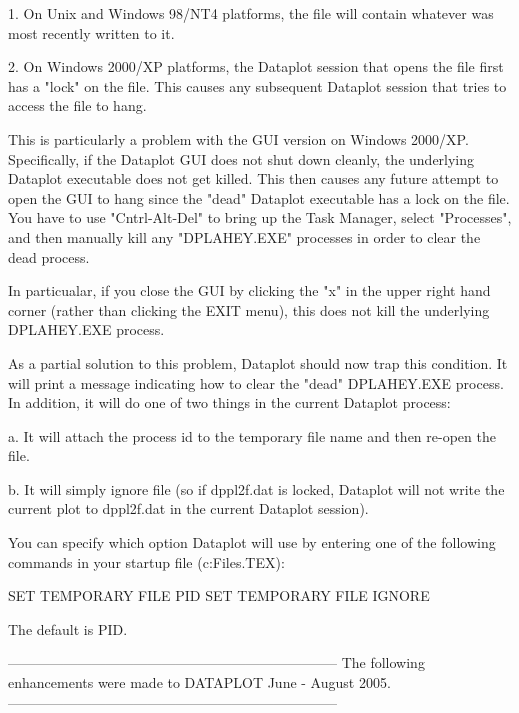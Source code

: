 {       1. On Unix and Windows 98/NT4 platforms, the file will
          contain whatever was most recently written to it.

       2. On Windows 2000/XP platforms, the Dataplot session
          that opens the file first has a "lock" on the file.
          This causes any subsequent Dataplot session that tries
          to access the file to hang.

          This is particularly a problem with the GUI version
          on Windows 2000/XP.  Specifically, if the Dataplot GUI
          does not shut down cleanly, the underlying Dataplot
          executable does not get killed.  This then causes any
          future attempt to open the GUI to hang since the "dead"
          Dataplot executable has a lock on the file.  You have to
          use "Cntrl-Alt-Del" to bring up the Task Manager, select
          "Processes", and then manually kill any "DPLAHEY.EXE"
          processes in order to clear the dead process.

          In particualar, if you close the GUI by clicking the
          "x" in the upper right hand corner (rather than clicking
          the EXIT menu), this does not kill the underlying
          DPLAHEY.EXE process.

          As a partial solution to this problem, Dataplot should
          now trap this condition.  It will print a message
          indicating how to clear the "dead" DPLAHEY.EXE process.
          In addition, it will do one of two things in the current
          Dataplot process:

          a. It will attach the process id to the temporary file
             name and then re-open the file.

          b. It will simply ignore file (so if dppl2f.dat is locked,
             Dataplot will not write the current plot to dppl2f.dat
             in the current Dataplot session).

          You can specify which option Dataplot will use by entering
          one of the following commands in your startup file
          (c:\Program Files\NIST\DATAPLOT\DPLOGF.TEX):

              SET TEMPORARY FILE PID
              SET TEMPORARY FILE IGNORE

          The default is PID.

-----------------------------------------------------------------------
The following enhancements were made to DATAPLOT June - August     2005.
-----------------------------------------------------------------------

}
